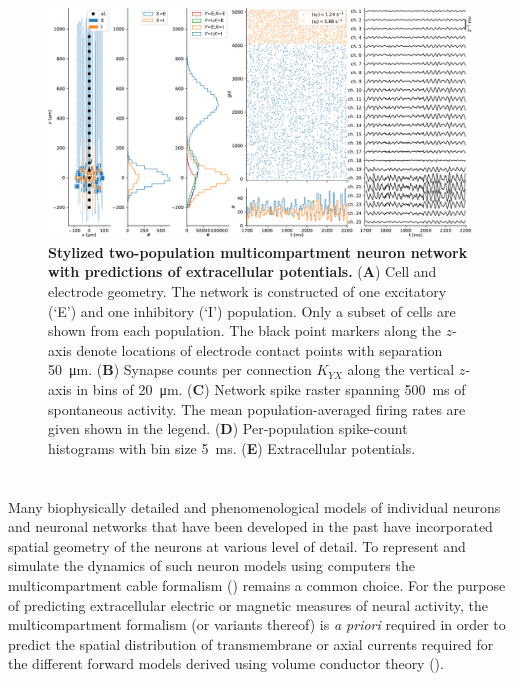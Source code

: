 \begin{figure}[!ht]
\begin{center}
\includegraphics[width=\textwidth]{Figures/Ch-LFPy/Ch-LFPy-network.pdf}
\end{center}
\caption{\textbf{Stylized two-population multicompartment neuron network with predictions of extracellular potentials.}
({\bf A}) Cell and electrode geometry. The network is constructed of one excitatory (`E') and one inhibitory (`I') population.
Only a subset of cells are shown from each population.
The black point markers along the $z$-axis denote locations of electrode contact points with separation \SI{50}{\micro\metre}. 
({\bf B}) Synapse counts per connection $K_{YX}$ along the vertical $z$-axis in bins of \SI{20}{\micro\metre}.
({\bf C}) Network spike raster spanning \SI{500}{\milli\second} of spontaneous activity. 
The mean population-averaged firing rates are given shown in the legend.
({\bf D}) Per-population spike-count histograms with bin size \SI{5}{\milli\second}.
({\bf E}) Extracellular potentials.
}
\label{fig:LFPy_network}
\end{figure}



\section{}
\label{sec:Schemes:HybridLFPy}


Many biophysically detailed and phenomenological models of individual neurons and neuronal networks that have been developed in the past have incorporated spatial geometry of the neurons at various level of detail.
To represent and simulate the dynamics of such neuron models using computers the multicompartment cable formalism () remains a common choice.
For the purpose of predicting extracellular electric or magnetic measures of neural activity,
the multicompartment formalism (or variants thereof) is \emph{a priori} required in order to predict the spatial distribution of transmembrane or axial currents required for the different forward models derived using volume conductor theory ().


